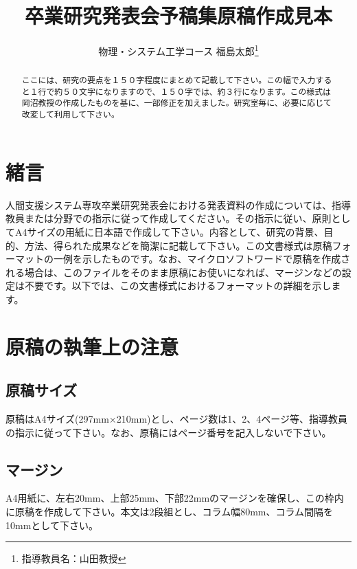\documentclass{proceedings}
\title{卒業研究発表会予稿集原稿作成見本}
\author{物理・システム工学コース \quad 福島太郎\thanks{指導教員名：山田教授}}
\date{}
\begin{document}
    \maketitle

    \begin{abstract}
    ここには、研究の要点を１５０字程度にまとめて記載して下さい。この幅で入力すると１行で約５０文字になりますので、１５０字では、約３行になります。この様式は岡沼教授の作成したものを基に、一部修正を加えました。研究室毎に、必要に応じて改変して利用して下さい。
    \end{abstract}

    \vspace{5mm}

    \begin{multicols}{2}

        \section{緒言}
        人間支援システム専攻卒業研究発表会における発表資料の作成については、指導教員または分野での指示に従って作成してください。その指示に従い、原則としてA4サイズの用紙に日本語で作成して下さい。内容として、研究の背景、目的、方法、得られた成果などを簡潔に記載して下さい。この文書様式は原稿フォーマットの一例を示したものです。なお、マイクロソフトワードで原稿を作成される場合は、このファイルをそのまま原稿にお使いになれば、マージンなどの設定は不要です。以下では、この文書様式におけるフォーマットの詳細を示します。

        \section{原稿の執筆上の注意}
        \subsection{原稿サイズ}
        原稿はA4サイズ(297mm×210mm)とし、ページ数は1、2、4ページ等、指導教員の指示に従って下さい。なお、原稿にはページ番号を記入しないで下さい。

        \subsection{マージン}
        A4用紙に、左右20mm、上部25mm、下部22mmのマージンを確保し、この枠内に原稿を作成して下さい。本文は2段組とし、コラム幅80mm、コラム間隔を10mmとして下さい。


\end{multicols}
\end{document}
